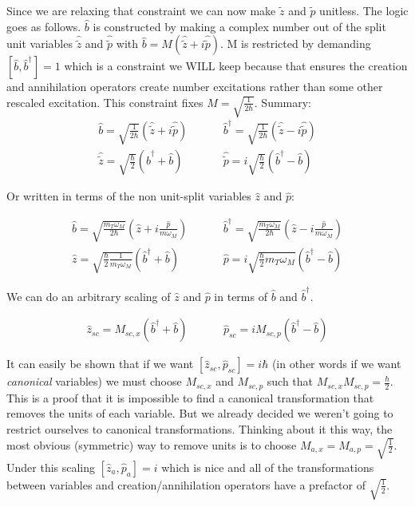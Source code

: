 \documentclass[12pt]{article}
\begin{document}
Since we are relaxing that constraint we can now make $\tilde{z}$ and $\tilde{p}$ unitless. The logic goes as follows. $\hat{b}$ is constructed by making a complex number out of the split unit variables $\hat{\tilde{z}}$ and $\hat{\tilde{p}}$ with $\hat{b} = M (\hat{\tilde{z}} + i \hat{\tilde{p}})$. M is restricted by demanding $[\hat{b},\hat{b}^{\dag}] = 1$ which is a constraint we WILL keep because that ensures the creation and annihilation operators create number excitations rather than some other rescaled excitation. This constraint fixes $M=\sqrt{\frac{1}{2\hbar}}$. Summary:
\begin{align}
\hat{b} = \sqrt{\frac{1}{2\hbar}}(\hat{\tilde{z}} + i \hat{\tilde{p}}) &\hspace{1cm}
\hat{b}^{\dag} = \sqrt{\frac{1}{2\hbar}}(\hat{\tilde{z}} - i \hat{\tilde{p}}) \\
\hat{\tilde{z}} =  \sqrt{\frac{\hbar}{2}} (\hat{b}^{\dag} + \hat{b}) &\hspace{1cm}
\hat{\tilde{p}} = i \sqrt{\frac{\hbar}{2}} (\hat{b}^{\dag} - \hat{b})
\end{align}

Or written in terms of the non unit-split variables $\hat{z}$ and $\hat{p}$:

\begin{align}
\hat{b} = \sqrt{\frac{m_T \omega_M}{2\hbar}}\left(\hat{z} + i \frac{\hat{p}}{m \omega_M}\right) &\hspace{1cm}
\hat{b}^{\dag} = \sqrt{\frac{m_T \omega_M}{2\hbar}}\left(\hat{z} - i \frac{\hat{p}}{m \omega_M}\right) \\
\hat{z} =  \sqrt{\frac{\hbar}{2}\frac{1}{m_T \omega_M}} (\hat{b}^{\dag} + \hat{b}) &\hspace{1cm}
\hat{p} = i \sqrt{\frac{\hbar}{2} m_T \omega_M} (\hat{b}^{\dag} - \hat{b})
\end{align}

We can do an arbitrary scaling of $\hat{z}$ and $\hat{p}$ in terms of $\hat{b}$ and $\hat{b}^{\dag}$.

\begin{align}
\hat{z}_{sc} =  M_{sc,x} (\hat{b}^{\dag} + \hat{b}) &\hspace{1cm}
\hat{p}_{sc} = i M_{sc,p} (\hat{b}^{\dag} - \hat{b})
\end{align}

It can easily be shown that if we want $[\hat{z}_{sc}, \hat{p}_{sc}] = i \hbar$ (in other words if we want \textit{canonical} variables) we must choose $M_{sc,x}$ and $M_{sc,p}$ such that $M_{sc,x} M_{sc,p} = \frac{\hbar}{2}$. This is a proof that it is impossible to find a canonical transformation that removes the units of each variable. But we already decided we weren't going to restrict ourselves to canonical transformations. Thinking about it this way, the most obvious (symmetric) way to remove units is to choose $M_{a,x} = M_{a,p} = \sqrt{\frac{1}{2}}$. Under this scaling $[\hat{z}_{a},\hat{p}_{a}] = i$ which is nice and all of the transformations between variables and creation/annihilation operators have a prefactor of $\sqrt{\frac{1}{2}}$.
\end{document}
